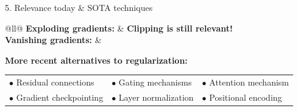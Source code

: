 \documentclass[final]{beamer}
\begin{document}
\begin{frame}[t]
\begin{columns}[t,totalwidth=\textwidth]
\begin{column}{0.35\textwidth}
\begin{block}{5. Relevance today \& SOTA techniques}
 
        
            \begin{tabular}{@{}ll@{}}
                \textbf{Exploding gradients:} & \textbf{Clipping is still relevant!} \\
                \textbf{Vanishing gradients:} & 
                    \begin{minipage}[t]{0.8\textwidth} 
                        \textbf{More recent alternatives to regularization:}\\[0.3em]
                        \begin{tabular}{@{}lll@{}}
                        $\bullet$ Residual connections     & $\bullet$ Gating mechanisms       & $\bullet$ Attention mechanism \\
                        $\bullet$ Gradient checkpointing   & $\bullet$ Layer normalization     & $\bullet$ Positional encoding \\
                        \end{tabular}
                    \end{minipage} \\
                \end{tabular}
                
                \end{block}
    
  


\end{column}
\end{columns}
\end{frame}
\end{document}
